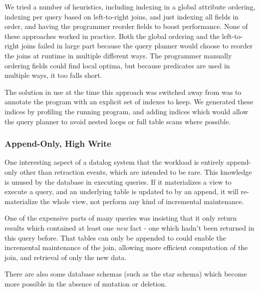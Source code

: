 We tried a number of heuristics, including indexing in a global attribute ordering, indexing per query based on left-to-right joins, and just indexing all fields in order, and having the programmer reorder fields to boost performance.
None of these approaches worked in practice.
Both the global ordering and the left-to-right joins failed in large part because the query planner would choose to reorder the joins at runtime in multiple different ways.
The programmer manually ordering fields could find local optima, but because predicates are used in multiple ways, it too falls short.

The solution in use at the time this approach was switched away from was to annotate the program with an explicit set of indexes to keep.
We generated these indices by profiling the running program, and adding indices which would allow the query planner to avoid nested loops or full table scans where possible.

\subsubsection{Append-Only, High Write}
One interesting aspect of a datalog system that the workload is entirely append-only other than retraction events, which are intended to be rare.
This knowledge is unused by the database in executing queries.
If it materializes a view to execute a query, and an underlying table is updated to by an append, it will re-materialize the whole view, not perform any kind of incremental maintenance.

One of the expensive parts of many queries was insisting that it only return results which contained at least one \emph{new} fact - one which hadn't been returned in this query before.
That tables can only be appended to could enable the incremental maintenance of the join, allowing more efficient computation of the join, and retrieval of only the new data.

There are also some database schemas (such as the star schema) which become more possible in the absence of mutation or deletion.
